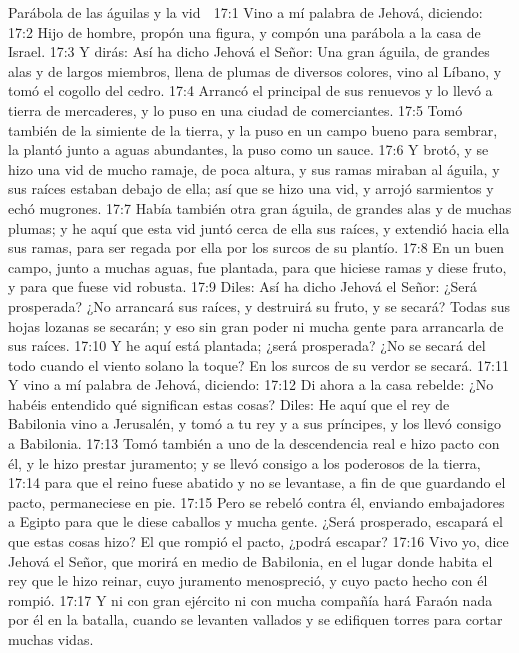 Parábola de las águilas y la vid 

17:1 Vino a mí palabra de Jehová, diciendo:  
17:2 Hijo de hombre, propón una figura, y compón una parábola a la casa de Israel.  
17:3 Y dirás: Así ha dicho Jehová el Señor: Una gran águila, de grandes alas y de largos miembros, llena de plumas de diversos colores, vino al Líbano, y tomó el cogollo del cedro.  
17:4 Arrancó el principal de sus renuevos y lo llevó a tierra de mercaderes, y lo puso en una ciudad de comerciantes.  
17:5 Tomó también de la simiente de la tierra, y la puso en un campo bueno para sembrar, la plantó junto a aguas abundantes, la puso como un sauce.  
17:6 Y brotó, y se hizo una vid de mucho ramaje, de poca altura, y sus ramas miraban al águila, y sus raíces estaban debajo de ella; así que se hizo una vid, y arrojó sarmientos y echó mugrones.  
17:7 Había también otra gran águila, de grandes alas y de muchas plumas; y he aquí que esta vid juntó cerca de ella sus raíces, y extendió hacia ella sus ramas, para ser regada por ella por los surcos de su plantío.  
17:8 En un buen campo, junto a muchas aguas, fue plantada, para que hiciese ramas y diese fruto, y para que fuese vid robusta.  
17:9 Diles: Así ha dicho Jehová el Señor: ¿Será prosperada? ¿No arrancará sus raíces, y destruirá su fruto, y se secará? Todas sus hojas lozanas se secarán; y eso sin gran poder ni mucha gente para arrancarla de sus raíces.  
17:10 Y he aquí está plantada; ¿será prosperada? ¿No se secará del todo cuando el viento solano la toque? En los surcos de su verdor se secará.  
17:11 Y vino a mí palabra de Jehová, diciendo:  
17:12 Di ahora a la casa rebelde: ¿No habéis entendido qué significan estas cosas? Diles: He aquí que el rey de Babilonia vino a Jerusalén, y tomó a tu rey y a sus príncipes, y los llevó consigo a Babilonia.  
17:13 Tomó también a uno de la descendencia real e hizo pacto con él, y le hizo prestar juramento; y se llevó consigo a los poderosos de la tierra, 
17:14 para que el reino fuese abatido y no se levantase, a fin de que guardando el pacto, permaneciese en pie.  
17:15 Pero se rebeló contra él,  enviando embajadores a Egipto para que le diese caballos y mucha gente. ¿Será prosperado, escapará el que estas cosas hizo? El que rompió el pacto, ¿podrá escapar?  
17:16 Vivo yo, dice Jehová el Señor, que morirá en medio de Babilonia, en el lugar donde habita el rey que le hizo reinar, cuyo juramento menospreció, y cuyo pacto hecho con él rompió.  
17:17 Y ni con gran ejército ni con mucha compañía hará Faraón nada por él en la batalla, cuando se levanten vallados y se edifiquen torres para cortar muchas vidas.  
